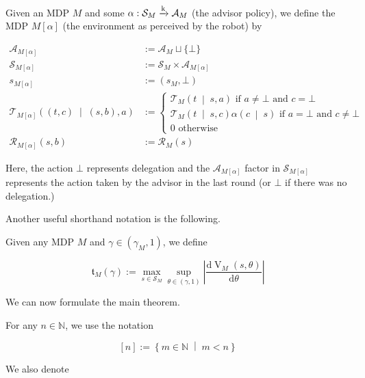 \documentclass[anon,12pt]{colt2018} %
\newcommand{\AP}[1]{\left(#1\right)}
\newcommand{\APM}[2]{\left(#1\;\middle\vert\;#2\right)}
\newcommand{\ACM}[2]{\left\{#1\;\middle\vert\;#2\right\}}
\newcommand{\D}{\mathrm{d}}
\newcommand{\Nats}{\mathbb{N}}
\newcommand{\Abs}[1]{\left\vert #1 \right\vert}
\newcommand{\K}{\xrightarrow{\textnormal{k}}}
\newcommand{\A}{\mathcal{A}}
\newcommand{\St}{\mathcal{S}}
\newcommand{\T}{\mathcal{T}}
\newcommand{\R}{\mathcal{R}}
\newcommand{\V}{\operatorname{V}}
\newcommand{\Tn}{\mathfrak{t}}
\newcommand{\Ad}{\alpha}
\begin{document}
\begin{samepage}
\begin{definition}

Given an MDP $M$ and some $\Ad: \St_M \K \A_M$ (the advisor policy), we define the MDP $M[\Ad]$ (the environment as perceived by the robot) by

\begin{align}
\A_{M[\Ad]}&:=\A_M \sqcup \{\bot\} \\
\St_{M[\Ad]}&:=\St_M \times \A_{M[\Ad]} \\ 
s_{M[\Ad]}&:=\AP{s_M,\bot} \\
\T_{M[\Ad]}\APM{\AP{t,c}}{\AP{s,b},a}&:=\begin{cases} \T_M\APM{t}{s,a} \text{ if } a\ne\bot \text{ and } c=\bot \\ \T_M\APM{t}{s,c}\Ad\APM{c}{s} \text{ if } a = \bot \text{ and } c\ne\bot \\ 0 \text{ otherwise} \end{cases} \\
\R_{M[\Ad]}(s,b)&:= \R_M(s)
\end{align}

Here, the action $\bot$ represents delegation and the $\A_{M[\Ad]}$ factor in $\St_{M[\Ad]}$ represents the action taken by the advisor in the last round (or $\bot$ if there was no delegation.)

\end{definition}
\end{samepage}

Another useful shorthand notation is the following.

\begin{samepage}
\begin{definition}

Given any MDP $M$ and $\gamma\in\AP{\gamma_M,1}$, we define

\begin{equation}
\Tn_{M}(\gamma):=\max_{s \in \St_M} \sup_{\theta\in(\gamma,1)} \Abs{\frac{\D{\V_{M}(s,\theta)}}{\D{\theta}}}
\end{equation}

\end{definition}
\end{samepage}

We can now formulate the main theorem.

For any $n \in \Nats$, we use the notation 

\[[n]:=\ACM{m\in\Nats}{m < n}\] 

We also denote 
\end{document}
